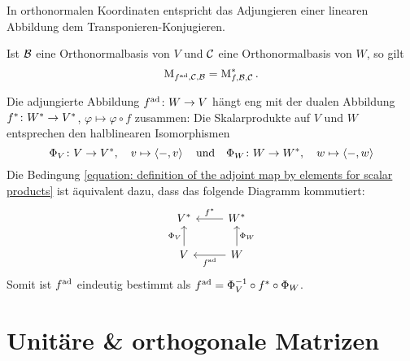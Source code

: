 In orthonormalen Koordinaten entspricht das Adjungieren einer linearen Abbildung dem Transponieren-Konjugieren.

\begin{lemma}
  Ist $\mathcal{B}$ eine Orthonormalbasis von $V$ und $\mathcal{C}$ eine Orthonormalbasis von $W$, so gilt
  \[
      \operatorname{M}_{f^{\operatorname{ad}}, \mathcal{C}, \mathcal{B}}
    = \operatorname{M}_{f, \mathcal{B}, \mathcal{C}} ^*.
  \]
\end{lemma}

Die adjungierte Abbildung $f^{\operatorname{ad}} \colon W \to V$ hängt eng mit der dualen Abbildung $f^* \colon W^* \to V^*$, $\varphi \mapsto \varphi \circ f$ zusammen:
Die Skalarprodukte auf $V$ und $W$ entsprechen den halblinearen Isomorphismen
\[
          \Phi_V
  \colon  V
  \to     V^*,
  \quad   v
  \mapsto \left\langle -, v \right\rangle
  \quad\text{und}\quad
  \Phi_W
  \colon  W
  \to     W^*,
  \quad   w
  \mapsto \left\langle -, w \right\rangle
\]
Die Bedingung \eqref{equation: definition of the adjoint map by elements for scalar products} ist äquivalent dazu, dass das folgende Diagramm kommutiert:
\[
  \begin{tikzcd}
      V^*
    & W^*
      \arrow[swap]{l}{\dual{f}}
    \\
      V
      \arrow{u}{\Phi_V}
    & W
      \arrow[swap]{u}{\Phi_W}
      \arrow{l}{\adj{f}}
  \end{tikzcd}
\]
Somit ist $f^{\operatorname{ad}}$ eindeutig bestimmt als $f^{\operatorname{ad}} = \Phi_V^{-1} \circ f^* \circ \Phi_W$.



\section{Unitäre \& orthogonale Matrizen}

